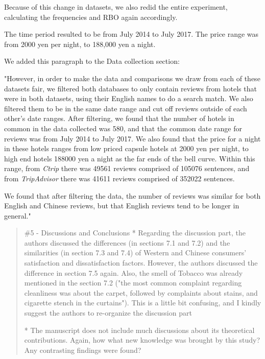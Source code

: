 \documentclass{letter}
\begin{document}
Because of this change in datasets, we also redid the entire experiment, calculating the frequencies and RBO again accordingly. 

The time period resulted to be from July 2014 to July 2017. The price range was from 2000 yen per night, to 188,000 yen a night.

We added this paragraph to the Data collection section:

"However, in order to make the data and comparisons we draw from each of these datasets fair, we filtered both databases to only contain reviews from hotels that were in both datasets, using their English names to do a search match. We also filtered them to be in the same date range and cut off reviews outside of each other's date ranges. After filtering, we found that the number of hotels in common in the data collected was \num[group-separator={,}]{580}, and that the common date range for reviews was from July 2014 to July 2017. We also found that the price for a night in these hotels ranges from low priced capsule hotels at 2000 yen per night, to high end hotels \num[group-separator={,}]{188000} yen a night as the far ends of the bell curve. Within this range, from \textit{Ctrip} there was \num[group-separator={,}]{49561} reviews comprised of \num[group-separator={,}]{105076} sentences, and from \textit{TripAdvisor} there was \num[group-separator={,}]{41611} reviews comprised of \num[group-separator={,}]{352022} sentences.

We found that after filtering the data, the number of reviews was similar for both English and Chinese reviews, but that English reviews tend to be longer in general."



\begin{quotation}
\#5 - Discussions and Conclusions
*  Regarding the discussion part, the authors discussed the differences (in sections 7.1 and 7.2) and the similarities (in section 7.3 and 7.4) of Western and Chinese consumers' satisfaction and dissatisfaction factors.  However, the authors discussed the difference in section 7.5 again. Also, the smell of Tobacco was already mentioned in the section 7.2 ("the most common complaint regarding cleanliness was about the carpet, followed by complaints about stains, and cigarette stench in the curtains"). This is a little bit confusing, and I kindly suggest the authors to re-organize the discussion part

*  The manuscript does not include much discussions about its theoretical contributions. Again, how what new knowledge was brought by this study? Any contrasting findings were found?
\end{quotation}
\end{document}
